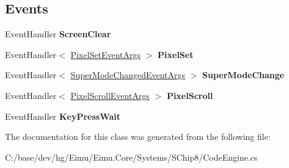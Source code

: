 \subsection*{Events}
\begin{DoxyCompactItemize}
\item 
\hypertarget{class_eimu_1_1_core_1_1_systems_1_1_s_chip8_1_1_code_engine_ace44c3d820a7f0e92a43290cbbc9cd69}{
EventHandler {\bfseries ScreenClear}}
\label{class_eimu_1_1_core_1_1_systems_1_1_s_chip8_1_1_code_engine_ace44c3d820a7f0e92a43290cbbc9cd69}

\item 
\hypertarget{class_eimu_1_1_core_1_1_systems_1_1_s_chip8_1_1_code_engine_a1ae7ea551cbea35085eccf9b7112d2b3}{
EventHandler$<$ \hyperlink{class_eimu_1_1_core_1_1_systems_1_1_s_chip8_1_1_pixel_set_event_args}{PixelSetEventArgs} $>$ {\bfseries PixelSet}}
\label{class_eimu_1_1_core_1_1_systems_1_1_s_chip8_1_1_code_engine_a1ae7ea551cbea35085eccf9b7112d2b3}

\item 
\hypertarget{class_eimu_1_1_core_1_1_systems_1_1_s_chip8_1_1_code_engine_a06b10f47543587d17b9f2659450d5c4d}{
EventHandler$<$ \hyperlink{class_eimu_1_1_core_1_1_systems_1_1_s_chip8_1_1_super_mode_changed_event_args}{SuperModeChangedEventArgs} $>$ {\bfseries SuperModeChange}}
\label{class_eimu_1_1_core_1_1_systems_1_1_s_chip8_1_1_code_engine_a06b10f47543587d17b9f2659450d5c4d}

\item 
\hypertarget{class_eimu_1_1_core_1_1_systems_1_1_s_chip8_1_1_code_engine_a26fa3df91996419878e46873cc42fc60}{
EventHandler$<$ \hyperlink{class_eimu_1_1_core_1_1_systems_1_1_s_chip8_1_1_pixel_scroll_event_args}{PixelScrollEventArgs} $>$ {\bfseries PixelScroll}}
\label{class_eimu_1_1_core_1_1_systems_1_1_s_chip8_1_1_code_engine_a26fa3df91996419878e46873cc42fc60}

\item 
\hypertarget{class_eimu_1_1_core_1_1_systems_1_1_s_chip8_1_1_code_engine_a4a8d12ed0a5883c92041b489129b075a}{
EventHandler {\bfseries KeyPressWait}}
\label{class_eimu_1_1_core_1_1_systems_1_1_s_chip8_1_1_code_engine_a4a8d12ed0a5883c92041b489129b075a}

\end{DoxyCompactItemize}


The documentation for this class was generated from the following file:\begin{DoxyCompactItemize}
\item 
C:/base/dev/hg/Eimu/Eimu.Core/Systems/SChip8/CodeEngine.cs\end{DoxyCompactItemize}
